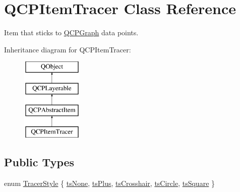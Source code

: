 \hypertarget{class_q_c_p_item_tracer}{}\section{Q\+C\+P\+Item\+Tracer Class Reference}
\label{class_q_c_p_item_tracer}


Item that sticks to \mbox{\hyperlink{class_q_c_p_graph}{Q\+C\+P\+Graph}} data points.  


Inheritance diagram for Q\+C\+P\+Item\+Tracer\+:\begin{figure}[H]
\begin{center}
\leavevmode
\includegraphics[height=4.000000cm]{class_q_c_p_item_tracer}
\end{center}
\end{figure}
\subsection*{Public Types}
\begin{DoxyCompactItemize}
\item 
enum \mbox{\hyperlink{class_q_c_p_item_tracer_a2f05ddb13978036f902ca3ab47076500}{Tracer\+Style}} \{ \newline
\mbox{\hyperlink{class_q_c_p_item_tracer_a2f05ddb13978036f902ca3ab47076500aac27462c79146225bfa8fba24d2ee8a4}{ts\+None}}, 
\mbox{\hyperlink{class_q_c_p_item_tracer_a2f05ddb13978036f902ca3ab47076500a3323fb04017146e4885e080a459472fa}{ts\+Plus}}, 
\mbox{\hyperlink{class_q_c_p_item_tracer_a2f05ddb13978036f902ca3ab47076500af562ec81ac3ba99e26ef8540cf1ec16f}{ts\+Crosshair}}, 
\mbox{\hyperlink{class_q_c_p_item_tracer_a2f05ddb13978036f902ca3ab47076500ae2252c28f4842880d71e9f94e69de94e}{ts\+Circle}}, 
\newline
\mbox{\hyperlink{class_q_c_p_item_tracer_a2f05ddb13978036f902ca3ab47076500a4ed5f01f2c5fd86d980366d79f481b9b}{ts\+Square}}
 \}
\end{DoxyCompactItemize}
